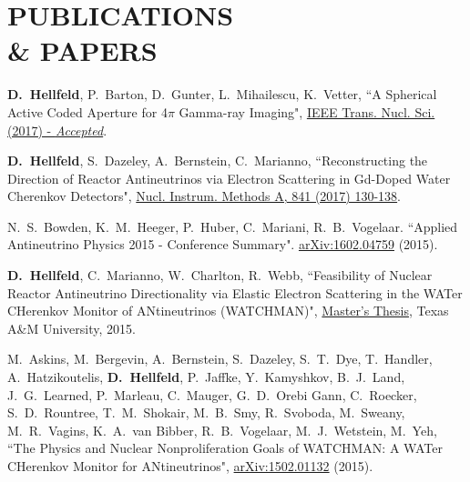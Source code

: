 \section{\small{PUBLICATIONS \\\& PAPERS}}

\begin{thebibliography}{3}
 \raggedright
\vspace{10pt}

 \textbf{D.~Hellfeld}, P.~Barton, D.~Gunter, L.~Mihailescu, K.~Vetter, ``A Spherical Active Coded Aperture for 4$\pi$ Gamma-ray Imaging", \href{http://ieeexplore.ieee.org/document/8048531/}{IEEE Trans. Nucl. Sci. (2017) - \sl{Accepted}}.
 
 \textbf{D.~Hellfeld}, S.~Dazeley, A.~Bernstein, C.~Marianno, ``Reconstructing the Direction of Reactor Antineutrinos via Electron Scattering in Gd-Doped Water Cherenkov Detectors", \href{http://www.sciencedirect.com/science/article/pii/S0168900216310555}{Nucl. Instrum. Methods A, 841 (2017) 130-138}.

 N.~S.~Bowden, K.~M.~Heeger, P.~Huber, C.~Mariani, R.~B.~Vogelaar. ``Applied Antineutrino Physics 2015 - Conference Summary". \href{http://arxiv.org/abs/1602.04759}{arXiv:1602.04759} (2015).

 \textbf{D.~Hellfeld}, C.~Marianno, W.~Charlton, R.~Webb, ``Feasibility of Nuclear Reactor Antineutrino Directionality via Elastic Electron Scattering in the WATer CHerenkov Monitor of ANtineutrinos (WATCHMAN)", \href{http://hdl.handle.net/1969.1/155140}{Master's Thesis}, Texas A\&M University, 2015.

 M.~Askins, M.~Bergevin, A.~Bernstein, S.~Dazeley, S.~T.~Dye, T.~Handler, A.~Hatzikoutelis, \textbf{D.~Hellfeld}, P.~Jaffke, Y.~Kamyshkov, B.~J.~Land, J.~G.~Learned, P.~Marleau, C.~Mauger, G.~D.~Orebi Gann, C.~Roecker, S.~D.~Rountree, T.~M.~Shokair, M.~B.~Smy, R.~Svoboda, M.~Sweany, M.~R.~Vagins, K.~A.~van Bibber, R.~B.~Vogelaar, M.~J.~Wetstein, M.~Yeh, ``The Physics and Nuclear Nonproliferation Goals of WATCHMAN: A WATer CHerenkov Monitor for ANtineutrinos", \href{http://arxiv.org/pdf/1502.01132.pdf}{arXiv:1502.01132} (2015).

\end{thebibliography}